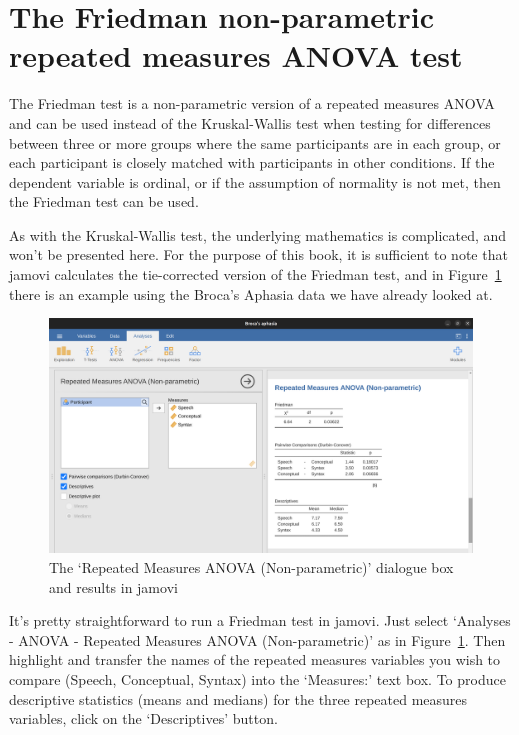 \documentclass[
  a4paper,
]{book}
\begin{document}
\hypertarget{the-friedman-non-parametric-repeated-measures-anova-test}{%
\section{The Friedman non-parametric repeated measures ANOVA
test}\label{the-friedman-non-parametric-repeated-measures-anova-test}}

The Friedman test is a non-parametric version of a repeated measures
ANOVA and can be used instead of the Kruskal-Wallis test when testing
for differences between three or more groups where the same participants
are in each group, or each participant is closely matched with
participants in other conditions. If the dependent variable is ordinal,
or if the assumption of normality is not met, then the Friedman test can
be used.

As with the Kruskal-Wallis test, the underlying mathematics is
complicated, and won't be presented here. For the purpose of this book,
it is sufficient to note that jamovi calculates the tie-corrected
version of the Friedman test, and in Figure~\ref{fig-fig13-14} there is
an example using the Broca's Aphasia data we have already looked at.

\begin{figure}

\includegraphics[width=1\textwidth,height=\textheight]{images/fig13-14.png} \hfill{}

\caption{\label{fig-fig13-14}The `Repeated Measures ANOVA
(Non-parametric)' dialogue box and results in jamovi}

\end{figure}

It's pretty straightforward to run a Friedman test in jamovi. Just
select `Analyses - ANOVA - Repeated Measures ANOVA (Non-parametric)' as
in Figure~\ref{fig-fig13-14}. Then highlight and transfer the names of
the repeated measures variables you wish to compare (Speech, Conceptual,
Syntax) into the `Measures:' text box. To produce descriptive statistics
(means and medians) for the three repeated measures variables, click on
the `Descriptives' button.
\end{document}
